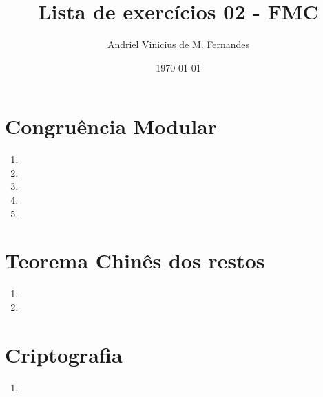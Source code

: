 \documentclass[12pt]{article}
\title{Lista de exercícios 02 - FMC}
\author{Andriel Vinicius de M. Fernandes}
\date{\today}
\begin{document}
\maketitle
\section{Congruência Modular}
\begin{enumerate}
	\item 
	\item 
	\item 
	\item 
	\item 
\end{enumerate}
\section{Teorema Chinês dos restos}
\begin{enumerate}
	\item 
	\item 
\end{enumerate}
\section{Criptografia}
\begin{enumerate}
	\item 
\end{enumerate}
\end{document}
